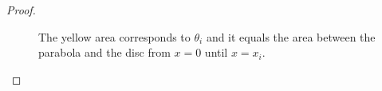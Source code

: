 \begin{proof}
\begin{figure}[h!]\label{fig:parabola-approx-in}
\center
	\hspace{15pt}%
\caption{The yellow area corresponds to $\theta_i$ and it equals the area between the parabola and the disc from $x=0$ until $x=x_i$.}
\end{figure}


\end{proof}
